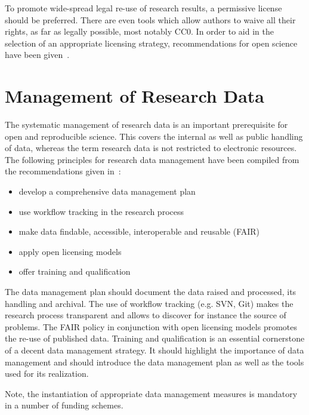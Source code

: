 \documentclass[a4paper, 10pt, twocolumn]{article}
\begin{document}
To promote wide-spread legal re-use of research results, a permissive license should be preferred.
There are even tools which allow authors to waive all their rights,
as far as legally possible, most notably CC0.
In order to aid in the selection of an appropriate licensing strategy, recommendations
for open science have been given~\cite{Stodden09:CSE,}.



\section*{Management of Research Data} \label{sec:data_management}

The systematic management of research data is an important prerequisite for open and 
reproducible science. This covers the internal as well as public handling of data, whereas
the term research data is not restricted to electronic resources. The following principles
for research data management have been compiled from the recommendations given 
in~\cite{DFG_GWP:Book,HRK_FDM:WWW,Stodden2014:JORS,H2020_FAIR:ERC}:
\begin{itemize}
\item develop a comprehensive data management plan
\item use workflow tracking in the research process
\item make data findable, accessible, interoperable and reusable (FAIR)~\cite{H2020_FAIR:ERC}
\item apply open licensing models
\item offer training and qualification
\end{itemize}
The data management plan should document the data raised and processed, its handling and
archival. The use of workflow tracking (e.g. SVN, Git) makes the research process transparent 
and allows to discover for instance the source of problems. The FAIR policy in conjunction with
open licensing models promotes the re-use of published data. Training and qualification is an
essential cornerstone of a decent data management strategy. It should highlight the importance
of data management and should introduce the data management plan as well as the tools used for
its realization.

Note, the instantiation of appropriate data management measures is mandatory in a number 
of funding schemes.


\end{document}
